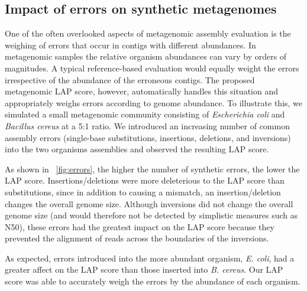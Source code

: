 \documentclass[12pt,\mydriver]{thesis}
\begin{document}
\subsection{Impact of errors on synthetic metagenomes}

One of the often overlooked aspects of metagenomic assembly evaluation is the weighing of errors that occur in contigs with different abundances.
In metagenomic samples the relative organism abundances can vary by orders of magnitudes.
A typical reference-based evaluation would equally weight the errors irrespective of the abundance of the erroneous contigs.
The proposed metagenomic LAP score, however, automatically handles this situation and appropriately weighs errors according to genome abundance.
To illustrate this, we simulated a small metagenomic community consisting of \emph{Escherichia coli} and \emph{Bacillus cereus} at a 5:1 ratio.
We introduced an increasing number of common assembly errors (single-base substitutions, insertions, deletions, and inversions) into the two organisms assemblies and observed the resulting LAP score.

As shown in \figurename~\ref{fig:errors}, the higher the number of synthetic errors, the lower the LAP score.
Insertions/deletions were more deleterious to the LAP score than substitutions, since in addition to causing a mismatch, an insertion/deletion changes the overall genome size.
Although inversions did not change the overall genome size (and would therefore not be detected by simplistic measures such as N50), these errors had the greatest impact on the LAP score because they prevented the alignment of reads across the boundaries of the inversions.


As expected, errors introduced into the more abundant organism, \emph{E. coli}, had a greater affect on the LAP score than those inserted into \emph{B. cereus}.
Our LAP score was able to accurately weigh the errors by the abundance of each organism.
\end{document}
